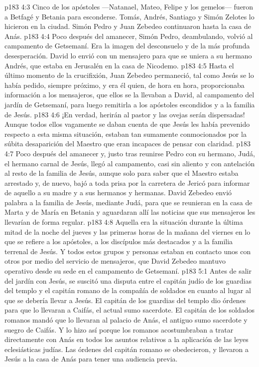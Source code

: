 \vs p183 4:3 Cinco de los apóstoles ---Natanael, Mateo, Felipe y los gemelos--- fueron a Betfagé y Betania para esconderse. Tomás, Andrés, Santiago y Simón Zelotes lo hicieron en la ciudad. Simón Pedro y Juan Zebedeo continuaron hasta la casa de Anás.
\vs p183 4:4 Poco después del amanecer, Simón Pedro, deambulando, volvió al campamento de Getsemaní. Era la imagen del desconsuelo y de la más profunda desesperación. David lo envió con un mensajero para que se uniera a su hermano Andrés, que estaba en Jerusalén en la casa de Nicodemo.
\vs p183 4:5 Hasta el último momento de la crucifixión, Juan Zebedeo permaneció, tal como Jesús se lo había pedido, siempre próximo, y era él quien, de hora en hora, proporcionaba información a los mensajeros, que ellos se la llevaban a David, al campamento del jardín de Getsemaní, para luego remitirla a los apóstoles escondidos y a la familia de Jesús.
\vs p183 4:6 ¡En verdad, herirán al pastor y las ovejas serán dispersadas! Aunque todos ellos vagamente se daban cuenta de que Jesús les había prevenido respecto a esta misma situación, estaban tan sumamente conmocionados por la súbita desaparición del Maestro que eran incapaces de pensar con claridad.
\vs p183 4:7 Poco después del amanecer y, justo tras reunirse Pedro con su hermano, Judá, el hermano carnal de Jesús, llegó al campamento, casi sin aliento y con antelación al resto de la familia de Jesús, aunque solo para saber que el Maestro estaba arrestado y, de nuevo, bajó a toda prisa por la carretera de Jericó para informar de aquello a su madre y a sus hermanos y hermanas. David Zebedeo envió palabra a la familia de Jesús, mediante Judá, para que se reunieran en la casa de Marta y de María en Betania y aguardaran allí las noticias que sus mensajeros les llevarían de forma regular.
\vs p183 4:8 Aquella era la situación durante la última mitad de la noche del jueves y las primeras horas de la mañana del viernes en lo que se refiere a los apóstoles, a los discípulos más destacados y a la familia terrenal de Jesús. Y todos estos grupos y personas estaban en contacto unos con otros por medio del servicio de mensajeros, que David Zebedeo mantuvo operativo desde su sede en el campamento de Getsemaní.
\vs p183 5:1 Antes de salir del jardín con Jesús, se suscitó una disputa entre el capitán judío de los guardias del templo y el capitán romano de la compañía de soldados en cuanto al lugar al que se debería llevar a Jesús. El capitán de los guardias del templo dio órdenes para que lo llevaran a Caifás, el actual sumo sacerdote. El capitán de los soldados romanos mandó que lo llevaran al palacio de Anás, el antiguo sumo sacerdote y suegro de Caifás. Y lo hizo así porque los romanos acostumbraban a tratar directamente con Anás en todos los asuntos relativos a la aplicación de las leyes eclesiásticas judías. Las órdenes del capitán romano se obedecieron, y llevaron a Jesús a la casa de Anás para tener una audiencia previa.
